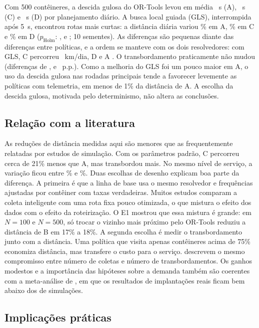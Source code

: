 Com 500 contêineres, a descida gulosa do OR-Tools levou em média
\RefSolAT{}~s (A), \RefSolCT{}~s (C) e \RefSolDT{}~s (D) por planejamento
diário. A busca local guiada (GLS), interrompida após 5~s, encontrou rotas
mais curtas: a distância diária variou \RelSolAKm\% em A, \RelSolCKm\% em C e
\RelSolDKm\% em D ($p_{\mathrm{Holm}}$: \PSolAKm, \PSolCKm{} e \PSolDKm; 10
sementes). As diferenças são pequenas diante das diferenças entre políticas,
e a ordem se manteve com os dois resolvedores: com GLS, C percorreu
\AltSolCKm{}~km/dia, D \AltSolDKm{} e A \AltSolAKm. O transbordamento
praticamente não mudou (diferenças de \DifSolAOv, \DifSolCOv{} e
\DifSolDOv{}~p.p.). Como a melhoria do GLS foi um pouco maior em A, o uso da
descida gulosa nas rodadas principais tende a favorecer levemente as
políticas com telemetria, em menos de 1\% da distância de A. A escolha da
descida gulosa, motivada pelo determinismo, não altera as conclusões.

\subsection{Relação com a literatura}\label{sec:literatura}

As reduções de distância medidas aqui são menores que as frequentemente
relatadas por estudos de simulação. Com os parâmetros padrão, C percorreu
cerca de 21\% menos que A, mas transbordou mais. No mesmo nível de serviço, a
variação ficou entre \RelFrontUmCvsA\% e \RelFrontDoisCvsA\%. Duas escolhas de
desenho explicam boa parte da diferença. A primeira é que a linha de base usa
o mesmo resolvedor e frequências ajustadas por contêiner com taxas
verdadeiras. Muitos estudos comparam a coleta inteligente com uma rota fixa
pouco otimizada, o que mistura o efeito dos dados com o efeito da
roteirização. O E1 mostrou que essa mistura é grande: em $N = 100$ e $N = 500$, só trocar
o vizinho mais próximo pelo OR-Tools reduziu a distância de B em 17\% a 18\%. A
segunda escolha é medir o transbordamento junto com a distância. Uma política
que visita apenas contêineres acima de 75\% economiza distância, mas transfere
o custo para o serviço. \cite{brouwer2023comparison} descrevem o mesmo
compromisso entre número de coletas e número de transbordamentos. Os ganhos
modestos e a importância das hipóteses sobre a demanda também são coerentes
com a meta-análise de \cite{maciel2025impact}, em que os resultados de
implantações reais ficam bem abaixo dos de simulações.

\subsection{Implicações práticas}\label{sec:implicacoes}

